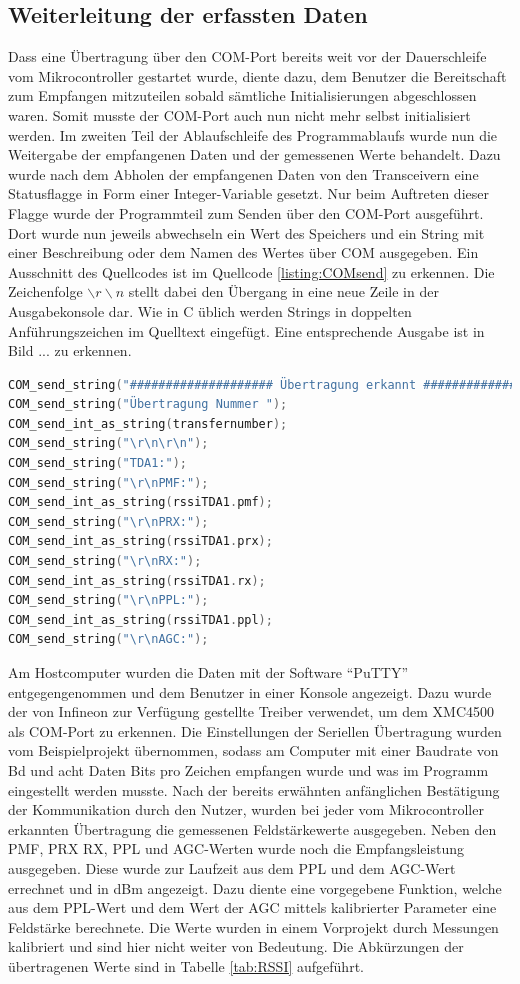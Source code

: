 \subsection{Weiterleitung der erfassten Daten}
Dass eine Übertragung über den COM-Port bereits weit vor der Dauerschleife vom Mikrocontroller gestartet wurde, diente dazu, dem Benutzer  die Bereitschaft zum Empfangen mitzuteilen sobald sämtliche Initialisierungen abgeschlossen waren. Somit musste der COM-Port auch nun nicht mehr selbst initialisiert werden.
Im zweiten Teil der Ablaufschleife des Programmablaufs wurde nun die Weitergabe der empfangenen Daten und der gemessenen Werte behandelt. Dazu wurde nach dem Abholen der empfangenen Daten von den Transceivern eine Statusflagge in Form einer Integer-Variable gesetzt. Nur beim Auftreten dieser Flagge wurde der Programmteil zum Senden über den COM-Port ausgeführt.
Dort wurde nun jeweils abwechseln ein Wert des Speichers und ein String mit einer Beschreibung oder dem Namen des Wertes über COM ausgegeben. Ein Ausschnitt des Quellcodes ist im Quellcode \ref{listing:COMsend} zu erkennen. Die Zeichenfolge $\backslash r\backslash n$ stellt dabei den Übergang in eine neue Zeile in der Ausgabekonsole dar. Wie in C üblich werden Strings in doppelten Anführungszeichen im Quelltext eingefügt. Eine entsprechende Ausgabe ist in Bild ... zu erkennen. %
\begin{lstlisting}[caption={Ausschnitt aus dem Senden der Daten über den COM-Port},label={listing:COMsend},captionpos=b,language=C]
COM_send_string("#################### Übertragung erkannt ####################\r\n");
COM_send_string("Übertragung Nummer ");
COM_send_int_as_string(transfernumber);
COM_send_string("\r\n\r\n");
COM_send_string("TDA1:");
COM_send_string("\r\nPMF:");
COM_send_int_as_string(rssiTDA1.pmf);
COM_send_string("\r\nPRX:");
COM_send_int_as_string(rssiTDA1.prx);
COM_send_string("\r\nRX:");
COM_send_int_as_string(rssiTDA1.rx);
COM_send_string("\r\nPPL:");
COM_send_int_as_string(rssiTDA1.ppl);
COM_send_string("\r\nAGC:");
\end{lstlisting}
Am Hostcomputer wurden die Daten mit der Software \enquote{PuTTY} entgegengenommen und dem Benutzer in einer Konsole angezeigt. Dazu wurde der von Infineon zur Verfügung gestellte Treiber verwendet, um dem XMC4500 als COM-Port zu erkennen. %
Die Einstellungen der Seriellen Übertragung wurden vom Beispielprojekt übernommen, sodass am Computer mit einer Baudrate von \unit[115200]{Bd} und acht Daten Bits pro Zeichen empfangen wurde und was im Programm eingestellt werden musste. Nach der bereits erwähnten anfänglichen Bestätigung der Kommunikation durch den Nutzer, wurden bei jeder vom Mikrocontroller erkannten Übertragung die gemessenen Feldstärkewerte ausgegeben. Neben den PMF, PRX RX, PPL und AGC-Werten wurde noch die Empfangsleistung ausgegeben. Diese wurde zur Laufzeit aus dem PPL und dem AGC-Wert errechnet und in dBm angezeigt. Dazu diente eine vorgegebene Funktion, welche aus dem PPL-Wert und dem Wert der \ac{AGC} mittels kalibrierter Parameter eine Feldstärke berechnete. Die Werte wurden in einem Vorprojekt durch Messungen kalibriert und sind hier nicht weiter von Bedeutung. Die Abkürzungen der übertragenen Werte sind in Tabelle \ref{tab:RSSI} aufgeführt.

